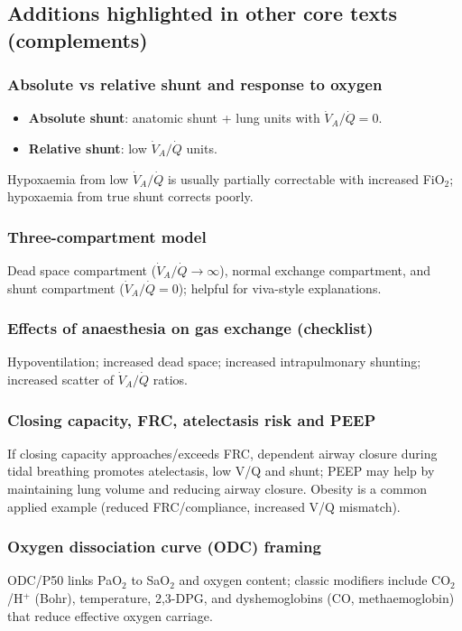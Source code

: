 \documentclass[11pt,a4paper]{article}
\begin{document}
\subsection{Additions highlighted in other core texts (complements)}
\subsubsection{Absolute vs relative shunt and response to oxygen}
\begin{itemize}
  \item \textbf{Absolute shunt}: anatomic shunt + lung units with \(\dot V_A/\dot Q = 0\).
  \item \textbf{Relative shunt}: low \(\dot V_A/\dot Q\) units.
\end{itemize}
Hypoxaemia from low \(\dot V_A/\dot Q\) is usually partially correctable with increased FiO$_2$; hypoxaemia from true shunt corrects poorly.

\subsubsection{Three-compartment model}
Dead space compartment (\(\dot V_A/\dot Q \to \infty\)), normal exchange compartment, and shunt compartment (\(\dot V_A/\dot Q = 0\)); helpful for viva-style explanations.

\subsubsection{Effects of anaesthesia on gas exchange (checklist)}
Hypoventilation; increased dead space; increased intrapulmonary shunting; increased scatter of \(\dot V_A/\dot Q\) ratios.

\subsubsection{Closing capacity, FRC, atelectasis risk and PEEP}
If closing capacity approaches/exceeds FRC, dependent airway closure during tidal breathing promotes atelectasis, low V/Q and shunt; PEEP may help by maintaining lung volume and reducing airway closure. Obesity is a common applied example (reduced FRC/compliance, increased V/Q mismatch).

\subsubsection{Oxygen dissociation curve (ODC) framing}
ODC/P50 links PaO$_2$ to SaO$_2$ and oxygen content; classic modifiers include CO$_2$/H$^+$ (Bohr), temperature, 2,3-DPG, and dyshemoglobins (CO, methaemoglobin) that reduce effective oxygen carriage.
\end{document}
